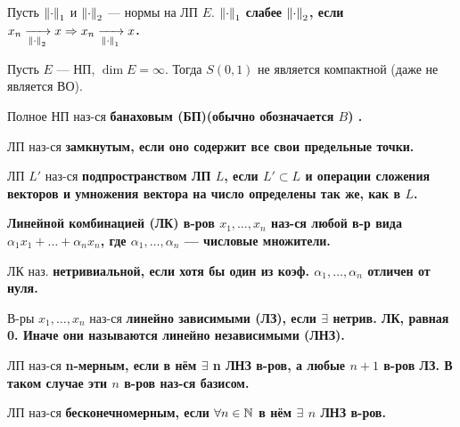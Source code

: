 \begin{defn}
Пусть $\left\lVert\cdot\right\rVert_1$ и $\left\lVert\cdot\right\rVert_2$ --- нормы на ЛП $E$. $\left\lVert\cdot\right\rVert_1$ \bf{слабее} $\left\lVert\cdot\right\rVert_2$, если $x_n \xrightarrow[\left\lVert\cdot\right\rVert_2]{} x \Rightarrow x_n \xrightarrow[\left\lVert\cdot\right\rVert_1]{} x$.
\end{defn}

\begin{thm}[4.1, Рисс]
Пусть $E$ --- НП, $\dim E = \infty$. Тогда $S(0, 1)$ не является компактной (даже не является ВО).
\end{thm}

\begin{defn}
Полное НП наз-ся \bf{банаховым (БП)}(обычно обозначается $B$) .
\end{defn}

\begin{defn}
ЛП наз-ся \bf{замкнутым}, если оно содержит все свои предельные точки.
\end{defn}

\begin{defn}
ЛП $L'$ наз-ся \bf{подпространством} ЛП $L$, если $L' \subset L$ и операции сложения векторов и умножения вектора на число определены так же, как в $L$.
\end{defn}

\begin{defn}
\bf{Линейной комбинацией (ЛК)} в-ров $x_1, \dots, x_n$ наз-ся любой в-р вида $\alpha_1 x_1 + \dots + \alpha_n x_n$, где $\alpha_1, \dots, \alpha_n$ --- числовые множители.
\end{defn}

\begin{defn}
ЛК наз. \bf{нетривиальной}, если хотя бы один из коэф. $\alpha_1, \dots, \alpha_n$ отличен от нуля.
\end{defn}

\begin{defn}
В-ры $x_1, \dots, x_n$ наз-ся \bf{линейно зависимыми (ЛЗ)}, если $\exists$ нетрив. ЛК, равная 0. Иначе они называются \bf{линейно независимыми (ЛНЗ)}.
\end{defn}

\begin{defn}
ЛП наз-ся \bf{n-мерным}, если в нём $\exists$ n ЛНЗ в-ров, а любые $n+1$ в-ров ЛЗ. В таком случае эти $n$ в-ров наз-ся базисом.
\end{defn}

\begin{defn}
ЛП наз-ся \bf{бесконечномерным}, если $\forall n \in \mathbb{N}$ в нём $\exists$ $n$ ЛНЗ в-ров.
\end{defn}

